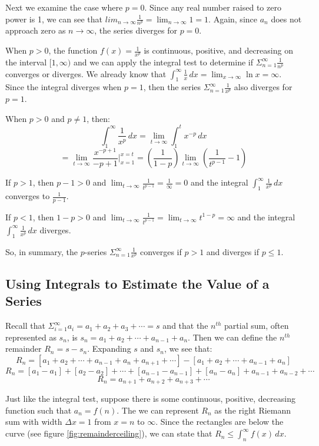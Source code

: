 Next we examine the case where $p=0$. Since any real number raised to zero 
power is 1, we can see that $lim_{n \to \infty} \frac{1}{n^p} = \lim_{n \to 
\infty} 1 = 1$. Again, since $a_n$ does not approach zero as $n \to \infty$, 
the series diverges for $p = 0$. 

When $p > 0$, the function $f(x) = \frac{1}{x^p}$ is continuous, positive, and 
decreasing on the interval $[1, \infty)$ and we can apply the integral test to 
determine if $\Sigma_{n=1}^\infty \frac{1}{n^p}$ converges or diverges. We 
already know that $\int_1^\infty \frac{1}{x}\,dx = \lim_{x \to \infty} \ln{x} 
= \infty$. Since the integral diverges when $p = 1$, then the series $\Sigma_
{n=1}^\infty \frac{1}{x^p}$ also diverges for $p = 1$. 

When $p > 0$ and $p \neq 1$, then:
$$\int_1^\infty \frac{1}{x^p}\,dx = \lim_{t \to \infty} \int_1^t x^{-p}\,dx $$
$$= \lim_{t \to \infty} \frac{x^{-p + 1}}{-p + 1}|_{x=1}^{x=t} = \left( \frac{1}
{1 - p} \right) \lim_{t \to \infty} \left( \frac{1}{t^{p - 1}} - 1 \right)$$

If $p > 1$, then $p - 1 >0$ and $\lim_{t \to \infty} \frac{1}{t^{p - 1}} = 
\frac{1}{\infty} = 0$ and the integral $\int_1^\infty \frac{1}{x^p}\,dx$ 
converges to $\frac{1}{p - 1}$. 

If $p < 1$, then $1 - p > 0$ and $\lim_{t \to \infty} \frac{1}{t^{p - 1}} = 
\lim_{t \to \infty} t^{1 - p} = \infty$ and the integral $\int_1^\infty 
\frac{1}{x^p}\,dx$ diverges. 

So, in summary, the $p$-series $\Sigma_{n = 1} ^ \infty \frac{1}{x^p}$ converges 
if $p > 1$ and diverges if $p \leq 1$. 

\subsection{Using Integrals to Estimate the Value of a Series}
Recall that $\Sigma_{i=1}^\infty a_i = a_1 + a_2 + a_3 + \cdots = s$ and that 
the $n^{th}$ partial sum, often represented as $s_n$, is $s_n = a_1 + a_2 + 
\cdots + a_{n-1} + a_n$. Then we can define the $n^{th}$ remainder $R_n = s - 
s_n$. Expanding $s$ and $s_n$, we see that:
$$R_n = \left[ a_1 + a_2 + \cdots + a_{n-1} + a_n + a_{n+1} + \cdots \right] - 
\left[ a_1 + a_2 + \cdots + a_{n-1} + a_{n} \right]$$
$$R_n = [a_1 - a_1] + [a_2 - a_2] + \cdots + [a_{n-1} - a_{n-1}] + [a_n - a_n] 
+ a_{n-1} + a_{n-2} + \cdots$$
$$R_n = a_{n+1} + a_{n+2} + a_{n+3} + \cdots$$

Just like the integral test, suppose there is some continuous, positive, 
decreasing function such that $a_n = f(n)$. The we can represent $R_n$ as the 
right Riemann sum with width $\Delta x = 1$ from $x = n$ to $\infty$. Since 
the rectangles are below the curve (see figure \ref{fig:remainderceiling}), we 
can state that $R_n \leq \int_n^\infty f(x)\,dx$.

